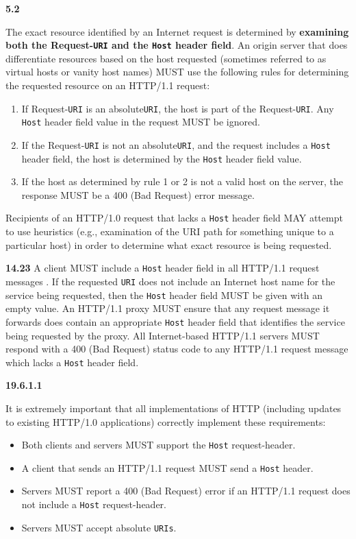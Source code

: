 \begin{multicols}{2}
\begin{spacing}{0.8}
	\textbf{5.2} 
	{\footnotesize The exact resource identified by an Internet request is determined by \textbf{examining both the Request-\texttt{URI} and the \texttt{Host} header field}.\vspace{1ex}	
	An origin server that does differentiate resources based on the host requested (sometimes referred to as virtual hosts or vanity host names) MUST use the following rules for determining the requested resource on an HTTP/1.1 request:	
		\begin{enumerate}
			\item If Request-\texttt{URI} is an absolute\texttt{URI}, the host is part of the Request-\texttt{URI}. Any \texttt{Host} header field value in the request MUST be ignored.
			\item If the Request-\texttt{URI} is not an absolute\texttt{URI}, and the request includes a \texttt{Host} header field, the host is determined by the \texttt{Host} header field value.
			\item If the host as determined by rule 1 or 2 is not a valid host on the server, the response MUST be a 400 (Bad Request) error message.
		\end{enumerate}	
	Recipients of an HTTP/1.0 request that lacks a \texttt{Host} header field MAY attempt to use heuristics (e.g., examination of the URI path for something unique to a particular host) in order to determine what exact resource is being requested.}\vspace{1.2ex}
	\textbf{14.23}
	{\footnotesize A client MUST include a \texttt{Host} header field in all HTTP/1.1 request messages . If the requested \texttt{URI} does not include an Internet host name for the service being requested, then the \texttt{Host} header field MUST be given with an empty value. An HTTP/1.1 proxy MUST ensure that any request message it forwards does contain an appropriate \texttt{Host} header field that identifies the service being requested by the proxy. All Internet-based HTTP/1.1 servers MUST respond with a 400 (Bad Request) status code to any HTTP/1.1 request message which lacks a \texttt{Host} header field.}
	
	\textbf{19.6.1.1}
	{\footnotesize It is extremely important that all implementations of HTTP (including updates to existing HTTP/1.0 applications) correctly implement these requirements:
		\begin{itemize}
			\item Both clients and servers MUST support the \texttt{Host} request-header.
			\item A client that sends an HTTP/1.1 request MUST send a \texttt{Host} header.
			\item Servers MUST report a 400 (Bad Request) error if an HTTP/1.1
				request does not include a \texttt{Host} request-header.
			\item Servers MUST accept absolute \texttt{URIs}.
		\end{itemize}
		}
	\end{spacing}
\end{multicols}


